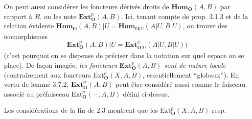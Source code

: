 On peut aussi considérer les foncteurs dérivés droits de
$\mathbf{Hom}_{\mathbf O}(A,B)$ par rapport à $B$, on les note
$\mathbf{Ext}_{\mathbf O}^p(A,B)$. Ici, tenant compte de prop. 3.1.3 et de la relation
évidente
$\mathbf{Hom}_{\mathbf O}(A,B)|U=\mathbf{Hom}_{{\mathbf O}|U}(A|U,B|U)$, on trouve des
isomorphismes
\[
\tag{4.2.3}
\mathbf{Ext}_{\mathbf O}^p(A,B)|U=
\mathbf{Ext}_{{\mathbf O}|U}^p(A|U,B|U))
\]
(c'est pourquoi on se dispense de préciser dans la notation sur quel espace
on se place). De façon imagée, \textit{les foncteurs
$\mathbf{Ext}_{\mathbf O}^p(A,B)$ sont de nature locale} (contrairement aux foncteurs
$\mathrm{Ext}_{\mathbf O}^p(X,A,B)$, essentiellement ``globaux''). En vertu de lemme
3.7.2, $\mathbf{Ext}_{\mathbf O}^p(A,B)$ peut être considéré aussi comme le faisceau
associé au préfaisceau $\mathrm{Ext}_{\mathbf O}^p(-;A,B)$ défini ci-dessus.

Les considérations de la fin de 2.3 montrent que les
$\mathrm{Ext}_{\mathbf O}^p(X;A,B)$ resp.

